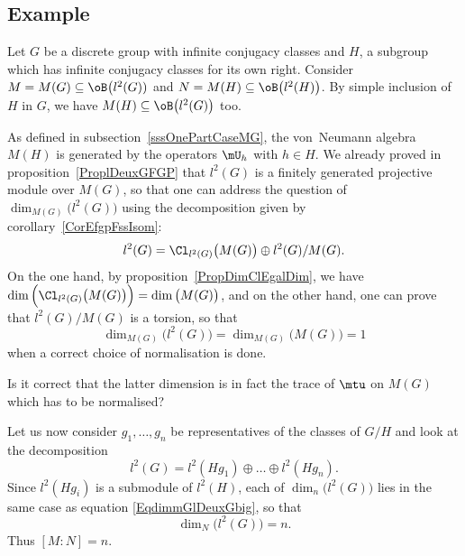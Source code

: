 					\subsection{Example}


Let $G$ be a discrete group with infinite conjugacy classes and $H$, a subgroup which has infinite conjugacy classes for its own right. Consider $M=M(G)\subseteq\oB\big(l^2(G))$ and $N=M(H)\subseteq\oB\big( l^2(H) \big)$. By simple inclusion of $H$ in $G$, we have $M(H)\subseteq\oB\big( l^2(G) \big)$ too.

As defined in subsection~\ref{sssOnePartCaseMG}, the von~Neumann algebra $M(H)$ is generated by the operators $\mU_h$ with $h\in H$. We already proved in proposition~\ref{ProplDeuxGFGP}\label{PglDeuxGFGPutiliseIci} that $l^2(G)$ is a finitely generated projective module over $M(G)$, so that one can address the question of $\dim_{M(G)}\big( l^2(G) \big)$ using the decomposition given by corollary~\ref{CorEfgpFssIsom}:
\begin{equation}
	l^2(G)=\Cl_{l^2(G)}\big( M(G) \big)\oplus l^2(G)/M(G).
\end{equation}
On the one hand, by proposition~\ref{PropDimClEgalDim}, we have $\dim\Big( \Cl_{l^2(G)}\big( M(G) \big) \Big)=\dim\big( M(G) \big)$, and on the other hand, one can prove that $l^2(G)/M(G)$ is a torsion, so that
\begin{equation}		\label{EqdimmGlDeuxGbig}
	\dim_{M(G)}\big( l^2(G) \big)=\dim_{M(G)}\big( M(G) \big)=1
\end{equation}
when a correct choice of normalisation is done.

\begin{probleme}
Is it correct that the latter dimension is in fact the trace of $\mtu$ on $M(G)$ which has to be normalised?
\end{probleme}

Let us now consider $g_1,\ldots,g_n$ be representatives of the classes of $G/H$ and look at the decomposition
\begin{equation}
	l^2(G)=l^2(Hg_1)\oplus\ldots\oplus l^2(Hg_n).
\end{equation}
Since $l^2(Hg_i)$ is a submodule of $l^2(H)$, each of $\dim_n\big( l^2(G) \big)$ lies in the same case as equation \eqref{EqdimmGlDeuxGbig}, so that
\begin{equation}
	\dim_N\big( l^2(G) \big)=n.
\end{equation}
Thus $[M:N]=n$.

